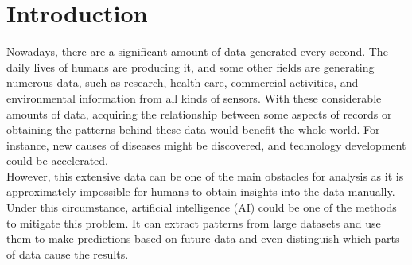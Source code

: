 \documentclass[12pt,twoside]{report}
\date{June 2022}
\begin{document}



\clearpage{\pagestyle{empty}\cleardoublepage}
\setcounter{page}{1}
\pagestyle{fancy}


\cleardoublepage

\clearpage{\pagestyle{empty}\cleardoublepage}

\tableofcontents 


\clearpage{\pagestyle{empty}\cleardoublepage}
\setcounter{page}{1}
\fancyhead[LE,RO]{\slshape \rightmark}
\fancyhead[LO,RE]{\slshape \leftmark}

\chapter{Introduction}

Nowadays, there are a significant amount of data generated every second. The daily lives of humans are producing it, and some other fields are generating numerous data, such as research, health care, commercial activities, and environmental information from all kinds of sensors. With these considerable amounts of data,  acquiring the relationship between some aspects of records or obtaining the patterns behind these data would benefit the whole world. For instance, new causes of diseases might be discovered, and technology development could be accelerated.
\\

However, this extensive data can be one of the main obstacles for analysis as it is approximately impossible for humans to obtain insights into the data manually. Under this circumstance, artificial intelligence (AI) could be one of the methods to mitigate this problem. It can extract patterns from large datasets and use them to make predictions based on future data and even distinguish which parts of data cause the results.
\\
\end{document}
